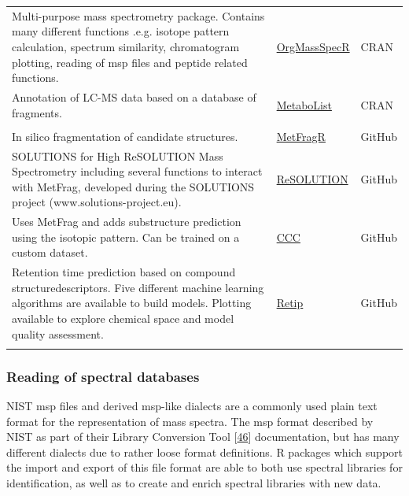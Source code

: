 \documentclass[]{article}
\begin{document}
\begin{longtable}{>{\raggedright\arraybackslash}p{30em}>{\raggedright\arraybackslash}p{10em}>{\raggedright\arraybackslash}p{3em}}
Multi-purpose mass spectrometry package. Contains many different functions .e.g. isotope pattern calculation, spectrum similarity, chromatogram plotting, reading of msp files and peptide related functions. & \href{https://cran.r-project.org/package=OrgMassSpecR}{OrgMassSpecR} & CRAN\\
\rowcolor{gray!6}  Annotation of LC-MS data based on a database of fragments. & \href{https://cran.r-project.org/package=MetaboList}{MetaboList} & CRAN\\
\addlinespace[0.3em]
\multicolumn{3}{l}{\textbf{In silico fragmentation}}\\
In silico fragmentation of candidate structures. & \href{https://github.com/c-ruttkies/MetFragR}{MetFragR} & GitHub\\
\rowcolor{gray!6}  SOLUTIONS for High ReSOLUTION Mass Spectrometry including several functions to interact with MetFrag, developed during the SOLUTIONS project (www.solutions-project.eu). & \href{https://github.com/schymane/ReSOLUTION}{ReSOLUTION} & GitHub\\
Uses MetFrag and adds substructure prediction using the isotopic pattern. Can be trained on a custom dataset. & \href{https://github.com/lucanard/CCC}{CCC} & GitHub\\
\rowcolor{gray!6}  Retention time prediction based on compound structuredescriptors. Five different machine learning algorithms are available to build models. Plotting available to explore chemical space and model quality assessment. & \href{https://github.com/PaoloBnn/Retip}{Retip} & GitHub\\*
\end{longtable}

\hypertarget{reading-of-spectral-databases}{%
\subsubsection{Reading of spectral databases}\label{reading-of-spectral-databases}}

NIST msp files and derived msp-like dialects are a commonly used plain text format for the representation of mass spectra. The msp format described by NIST as part of their Library Conversion Tool {[}\protect\hyperlink{ref-thenationalinstituteofstandardsandtechnology_website_2012}{46}{]} documentation, but has many different dialects due to rather loose format definitions. R packages which support the import and export of this file format are able to both use spectral libraries for identification, as well as to create and enrich spectral libraries with new data.
\end{document}
